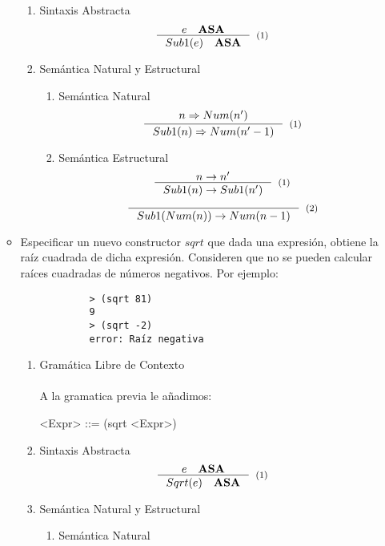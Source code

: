 \documentclass{article}
\begin{document}
\begin{enumerate}
\begin{itemize}
\begin{enumerate}
            \item Sintaxis Abstracta
                \[
                \inference{e \quad \textbf{ASA}}{Sub1(e) \quad \textbf{ASA}}[(1)]
                \]
            \item Semántica Natural y Estructural
            \begin{enumerate}
                \item Semántica Natural
                    \[
                        \inference{n \Rightarrow Num(n')}{Sub1(n) \Rightarrow Num(n' - 1)}[(1)]
                    \]

                \item Semántica Estructural
                    \[ \inference{n\rightarrow n'}{Sub1(n) 
\rightarrow Sub1(n')}[(1)] \]
                    \[ \inference{}{Sub1(Num(n)) \rightarrow Num(n - 1)}[(2)] \]
            \end{enumerate}
        \end{enumerate}

        \item Especificar un nuevo constructor $sqrt$ que dada una expresión, obtiene la raíz cuadrada de dicha expresión. Consideren que no se pueden calcular raíces cuadradas de números negativos. Por ejemplo:

        \begin{verbatim}
            > (sqrt 81)
            9
            > (sqrt -2)
            error: Raíz negativa
        \end{verbatim}

        \begin{enumerate}
            \item Gramática Libre de Contexto
            \\ \\
            A la gramatica previa le añadimos:
            \\
            \begin{grammar}
                <Expr> ::= (sqrt <Expr>)
            \end{grammar}
            \item Sintaxis Abstracta
                \[
                    \inference{e \quad \textbf{ASA}}{Sqrt(e) \quad \textbf{ASA}}[(1)]
                \]
            \item Semántica Natural y Estructural
            \begin{enumerate}
                \item Semántica Natural


\end{enumerate}
\end{enumerate}
\end{itemize}
\end{enumerate}
\end{document}
